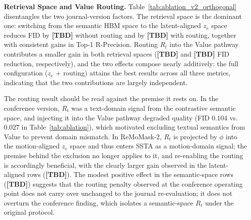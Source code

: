 \documentclass[10pt,journal,compsoc]{IEEEtran}
\newcommand{\myparagraph}[1]{\textbf{#1}\hspace{1.8ex}}
\begin{document}
\begin{table}[t]
    \centering
    \caption{Mask-Transformer-only diagnosis on HumanML3D. Each system is evaluated with the Mask Transformer alone (no residual refinement) and with the full generation pipeline, under otherwise identical settings and the controlled training protocol of this journal version.}
    \label{tab:ablation_v2_maskonly}
    \renewcommand{\arraystretch}{1.3}  %
\end{table}

\noindent \myparagraph{Retrieval Space and Value Routing.}
Table~\ref{tab:ablation_v2_orthogonal} disentangles the two journal-version factors. The retrieval space is the dominant one: switching from the semantic HBM space to the latent-aligned $z_e$ space reduces FID by \textbf{[TBD]} without routing and by \textbf{[TBD]} with routing, together with consistent gains in Top-1 R-Precision. Routing $R_t$ into the Value pathway contributes a smaller gain in both retrieval spaces (\textbf{[TBD]} and \textbf{[TBD]} FID reduction, respectively), and the two effects compose nearly additively: the full configuration ($z_e$ + routing) attains the best results across all three metrics, indicating that the two contributions are largely independent.

The routing result should be read against the premise it rests on. In the conference version, $R_t$ was a text-domain signal from the contrastive semantic space, and injecting it into the Value pathway degraded quality (FID $0.104$ vs.\ $0.027$ in Table~\ref{tab:ablation}), which motivated excluding textual semantics from Value to prevent domain mismatch. In ReMoMask-2, $R_t$ is projected by $\phi$ into the motion-aligned $z_e$ space and thus enters SSTA as a motion-domain signal; the premise behind the exclusion no longer applies to it, and re-enabling the routing is accordingly beneficial, with the clearly larger gain observed in the latent-aligned rows (\textbf{[TBD]}). The modest positive effect in the semantic-space rows (\textbf{[TBD]}) suggests that the routing penalty observed at the conference operating point does not carry over unchanged to the journal re-evaluation; it does not overturn the conference finding, which isolates a semantic-space $R_t$ under the original protocol.
\end{document}
